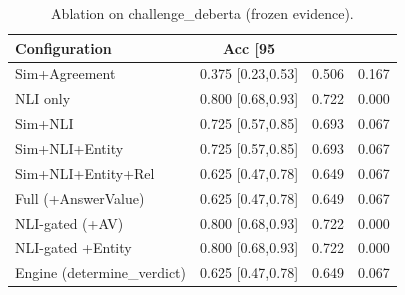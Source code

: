 \begin{table}[t]
\centering
\caption{Ablation on challenge_deberta (frozen evidence).}
\label{tab:ablation_challenge_deberta}
\small
\begin{tabular}{lccc}
\hline
Configuration & Acc [95\\%
\hline
Sim+Agreement & 0.375 [0.23,0.53] & 0.506 & 0.167 \\
NLI only & 0.800 [0.68,0.93] & 0.722 & 0.000 \\
Sim+NLI & 0.725 [0.57,0.85] & 0.693 & 0.067 \\
Sim+NLI+Entity & 0.725 [0.57,0.85] & 0.693 & 0.067 \\
Sim+NLI+Entity+Rel & 0.625 [0.47,0.78] & 0.649 & 0.067 \\
Full (+AnswerValue) & 0.625 [0.47,0.78] & 0.649 & 0.067 \\
NLI-gated (+AV) & 0.800 [0.68,0.93] & 0.722 & 0.000 \\
NLI-gated +Entity & 0.800 [0.68,0.93] & 0.722 & 0.000 \\
Engine (determine\_verdict) & 0.625 [0.47,0.78] & 0.649 & 0.067 \\
\hline
\end{tabular}
\end{table}